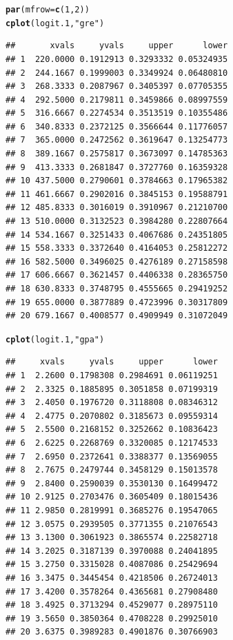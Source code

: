 \documentclass[onesided]{article}\usepackage[]{graphicx}\usepackage[]{color}
\makeatletter
\newcommand{\hlnum}[1]{\textcolor[rgb]{0.686,0.059,0.569}{#1}}%
\newcommand{\hlstr}[1]{\textcolor[rgb]{0.192,0.494,0.8}{#1}}%
\newcommand{\hlstd}[1]{\textcolor[rgb]{0.345,0.345,0.345}{#1}}%
\newcommand{\hlkwc}[1]{\textcolor[rgb]{0.333,0.667,0.333}{#1}}%
\newcommand{\hlkwd}[1]{\textcolor[rgb]{0.737,0.353,0.396}{\textbf{#1}}}%
\newenvironment{kframe}{%
 \def\at@end@of@kframe{}%
 \ifinner\ifhmode%
  \def\at@end@of@kframe{\end{minipage}}%
  \begin{minipage}{\columnwidth}%
 \fi\fi%
 \def\FrameCommand##1{\hskip\@totalleftmargin \hskip-\fboxsep
 \colorbox{shadecolor}{##1}\hskip-\fboxsep
     \hskip-\linewidth \hskip-\@totalleftmargin \hskip\columnwidth}%
 \MakeFramed {\advance\hsize-\width
   \@totalleftmargin\z@ \linewidth\hsize
   \@setminipage}}%
 {\par\unskip\endMakeFramed%
 \at@end@of@kframe}
\newenvironment{knitrout}{}{} %
\makeatother
\begin{document}
\begin{knitrout}
\color{fgcolor}\begin{kframe}
\begin{alltt}
\hlkwd{par}\hlstd{(}\hlkwc{mfrow}\hlstd{=}\hlkwd{c}\hlstd{(}\hlnum{1}\hlstd{,}\hlnum{2}\hlstd{))}
\hlkwd{cplot}\hlstd{(logit.1,} \hlstr{"gre"}\hlstd{)}
\end{alltt}
\begin{verbatim}
##       xvals     yvals     upper      lower
## 1  220.0000 0.1912913 0.3293332 0.05324935
## 2  244.1667 0.1999003 0.3349924 0.06480810
## 3  268.3333 0.2087967 0.3405397 0.07705355
## 4  292.5000 0.2179811 0.3459866 0.08997559
## 5  316.6667 0.2274534 0.3513519 0.10355486
## 6  340.8333 0.2372125 0.3566644 0.11776057
## 7  365.0000 0.2472562 0.3619647 0.13254773
## 8  389.1667 0.2575817 0.3673097 0.14785363
## 9  413.3333 0.2681847 0.3727760 0.16359328
## 10 437.5000 0.2790601 0.3784663 0.17965382
## 11 461.6667 0.2902016 0.3845153 0.19588791
## 12 485.8333 0.3016019 0.3910967 0.21210700
## 13 510.0000 0.3132523 0.3984280 0.22807664
## 14 534.1667 0.3251433 0.4067686 0.24351805
## 15 558.3333 0.3372640 0.4164053 0.25812272
## 16 582.5000 0.3496025 0.4276189 0.27158598
## 17 606.6667 0.3621457 0.4406338 0.28365750
## 18 630.8333 0.3748795 0.4555665 0.29419252
## 19 655.0000 0.3877889 0.4723996 0.30317809
## 20 679.1667 0.4008577 0.4909949 0.31072049
\end{verbatim}
\begin{alltt}
\hlkwd{cplot}\hlstd{(logit.1,} \hlstr{"gpa"}\hlstd{)}
\end{alltt}
\begin{verbatim}
##     xvals     yvals     upper      lower
## 1  2.2600 0.1798308 0.2984691 0.06119251
## 2  2.3325 0.1885895 0.3051858 0.07199319
## 3  2.4050 0.1976720 0.3118808 0.08346312
## 4  2.4775 0.2070802 0.3185673 0.09559314
## 5  2.5500 0.2168152 0.3252662 0.10836423
## 6  2.6225 0.2268769 0.3320085 0.12174533
## 7  2.6950 0.2372641 0.3388377 0.13569055
## 8  2.7675 0.2479744 0.3458129 0.15013578
## 9  2.8400 0.2590039 0.3530130 0.16499472
## 10 2.9125 0.2703476 0.3605409 0.18015436
## 11 2.9850 0.2819991 0.3685276 0.19547065
## 12 3.0575 0.2939505 0.3771355 0.21076543
## 13 3.1300 0.3061923 0.3865574 0.22582718
## 14 3.2025 0.3187139 0.3970088 0.24041895
## 15 3.2750 0.3315028 0.4087086 0.25429694
## 16 3.3475 0.3445454 0.4218506 0.26724013
## 17 3.4200 0.3578264 0.4365681 0.27908480
## 18 3.4925 0.3713294 0.4529077 0.28975110
## 19 3.5650 0.3850364 0.4708228 0.29925010
## 20 3.6375 0.3989283 0.4901876 0.30766903
\end{verbatim}
\end{kframe}


\end{knitrout}
\end{document}
